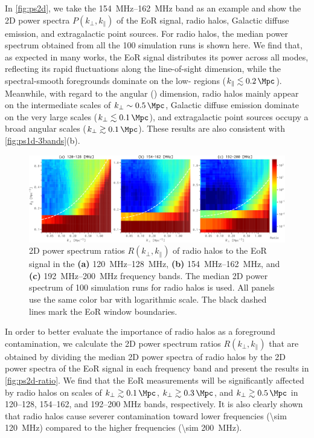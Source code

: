 \documentclass[modern]{aastex62}
\newcommand{\klos}{\text{$k_{\parallel}$}}
\newcommand{\kperp}{\text{$k_{\bot}$}}
\begin{document}
{\color{cyan}%
In \autoref{fig:ps2d}, we take the \SIrange{154}{162}{\MHz} band as an
example and show the 2D power spectra $P(\kperp, \klos)$ of the EoR
signal, radio halos, Galactic diffuse emission, and extragalactic point
sources.
For radio halos, the median power spectrum obtained from all the 100
simulation runs is shown here.
We find that, as expected in many works,
the EoR signal distributes its power across all \klos{} modes, reflecting
its rapid fluctuations along the line-of-sight dimension,
while the spectral-smooth foregrounds dominate on the low-\klos{} regions
($\klos{} \lesssim \SI{0.2}{\per\Mpc}$).
Meanwhile, with regard to the angular (\kperp) dimension,
radio halos mainly appear on the intermediate scales of
$\kperp \sim \SI{0.5}{\per\Mpc}$,
Galactic diffuse emission dominate on the very large scales
($\kperp \lesssim \SI{0.1}{\per\Mpc}$),
and extragalactic point sources occupy a broad angular scales
($\kperp \gtrsim \SI{0.1}{\per\Mpc}$).
These results are also consistent with \autoref{fig:ps1d-3bands}(b).

\begin{figure}
  \centering
  \includegraphics[width=\textwidth]{ps2d-ratio-3bands}
  \caption{\label{fig:ps2d-ratio}%
    2D power spectrum ratios $R(\kperp, \klos)$ of radio halos to the
    EoR signal in the
    \textbf{(a)} \SIrange{120}{128}{\MHz},
    \textbf{(b)} \SIrange{154}{162}{\MHz}, and
    \textbf{(c)} \SIrange{192}{200}{\MHz} frequency bands.
    The median 2D power spectrum of 100 simulation runs for radio halos
    is used.
    All panels use the same color bar with logarithmic scale.
    The black dashed lines mark the EoR window boundaries.
  }
\end{figure}

In order to better evaluate the importance of radio halos
as a foreground contamination, we calculate the 2D power spectrum ratios
$R(\kperp, \klos)$ that are obtained by dividing the median 2D power
spectra of radio halos by the 2D power spectra of the EoR signal in each
frequency band and present the results in \autoref{fig:ps2d-ratio}.
We find that the EoR measurements will be significantly affected by radio
halos on scales of $\kperp \gtrsim \SI{0.1}{\per\Mpc}$,
$\kperp \gtrsim \SI{0.3}{\per\Mpc}$, and
$\kperp \gtrsim \SI{0.5}{\per\Mpc}$ in
\numrange{120}{128}, \numrange{154}{162}, and \numrange{192}{200}
\si{\MHz} bands, respectively.
It is also clearly shown that radio halos cause severer contamination
toward lower frequencies (\SI{\sim 120}{\MHz}) compared to the higher
frequencies (\SI{\sim 200}{\MHz}).

}
\end{document}
